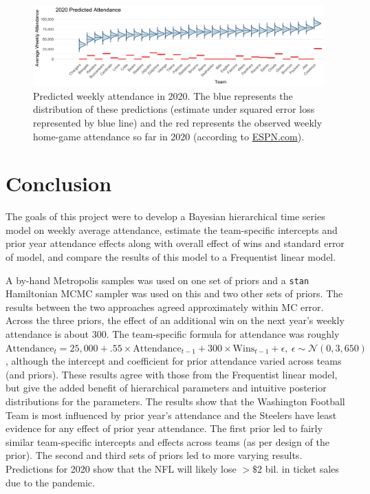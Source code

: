\documentclass[11pt]{article}
\newcommand{\code}{\texttt}
\begin{document}
\begin{figure}
    \centering
    \includegraphics[width=\textwidth]{Predictions.jpg}
    \caption{\footnotesize Predicted weekly attendance in 2020. The blue represents the distribution of these predictions (estimate under squared error loss represented by blue line) and the red represents the observed weekly home-game attendance so far in 2020 (according to  \href{http://www.espn.com/nfl/attendance}{ESPN.com}). \vspace*{-.5\baselineskip}}
    \label{fig:preds}
\end{figure}


\vspace*{-.5\baselineskip}
\section{Conclusion}

The goals of this project were to develop a Bayesian hierarchical time series model on weekly average attendance, estimate the team-specific intercepts and prior year attendance effects along with overall effect of wins and standard error of model, and compare the results of this model to a Frequentist linear model.

A by-hand Metropolis samples was used on one set of priors and a \code{stan} Hamiltonian MCMC sampler was used on this and two other sets of priors. The results between the two approaches agreed approximately within MC error. Across the three priors, the effect of an additional win on the next year's weekly attendance is about $300$. The team-specific formula for attendance was roughly $\text{Attendance}_{t}=25{,}000 + .55\times\text{Attendance}_{t-1} + 300\times\text{Wins}_{t-1}+\epsilon,~\epsilon\sim\mathcal{N}(0,3{,}650)$, although the intercept and coefficient for prior attendance varied across teams (and priors). These results agree with those from the Frequentist linear model, but give the added benefit of hierarchical parameters and intuitive posterior distributions for the parameters. The results show that the Washington Football Team is most influenced by prior year's attendance and the Steelers have least evidence for any effect of prior year attendance. The first prior led to fairly similar team-specific intercepts and effects across teams (as per design of the prior). The second and third sets of priors led to more varying results. Predictions for 2020 show that the NFL will likely lose $>\$2$ bil. in ticket sales due to the pandemic.
\end{document}
